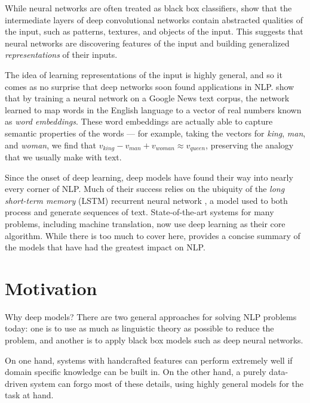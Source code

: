 \documentclass[11pt]{report}
\begin{document}

While neural networks are often treated as black box classifiers, \citet{Zeiler2014} show that the intermediate layers of deep convolutional networks contain abstracted qualities of the input, such as patterns, textures, and objects of the input. This suggests that neural networks are discovering features of the input and building generalized \emph{representations} of their inputs.


The idea of learning representations of the input is highly general, and so it comes as no surprise that deep networks soon found applications in NLP. \citet{mikolov2013word2vec} show that by training a neural network on a Google News text corpus, the network learned to map words in the English language to a vector of real numbers known as \emph{word embeddings}. These word embeddings are actually able to capture semantic properties of the words --- for example, taking the vectors for \emph{king}, \emph{man}, and \emph{woman}, we find that $v_{king} - v_{man} + v_{woman} \approx v_{queen}$, preserving the analogy that we usually make with text.


Since the onset of deep learning, deep models have found their way into nearly every corner of NLP. Much of their success relies on the ubiquity of the \emph{long short-term memory} (LSTM) recurrent neural network \citep{hochreiter1997long}, a model used to both process and generate sequences of text. State-of-the-art systems for many problems, including machine translation, now use deep learning as their core algorithm. While there is too much to cover here, \citet{goldberg2015primer} provides a concise summary of the models that have had the greatest impact on NLP. %


\section{Motivation}


Why deep models? There are two general approaches for solving NLP problems today: one is to use as much as linguistic theory as possible to reduce the problem, and another is to apply black box models such as deep neural networks.

On one hand, systems with handcrafted features can perform extremely well if domain specific knowledge can be built in. 
On the other hand, a purely data-driven system can forgo most of these details, using highly general models for the task at hand.
\end{document}
